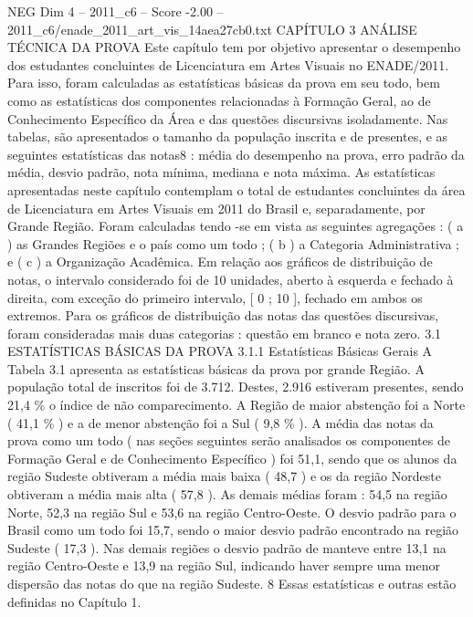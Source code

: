 \begin{textsample}{NEG Dim 4 – 2011\_c6 – Score -2.00 – 2011\_c6/enade\_2011\_art\_vis\_14aea27cb0.txt}  \label{ex:f4_neg_056}
CAPÍTULO 3 ANÁLISE TÉCNICA DA PROVA Este capítulo tem por objetivo apresentar o desempenho dos estudantes concluintes de Licenciatura em Artes Visuais no ENADE/2011.
Para isso, foram calculadas as estatísticas básicas da prova em seu todo, bem como as estatísticas dos componentes relacionadas à Formação Geral, ao de Conhecimento Específico da Área e das questões discursivas isoladamente.
Nas tabelas, são apresentados o tamanho da população inscrita e de presentes, e as seguintes estatísticas das notas8 : média do desempenho na prova, erro padrão da média, desvio padrão, nota mínima, mediana e nota máxima.
As estatísticas apresentadas neste capítulo contemplam o total de estudantes concluintes da área de Licenciatura em Artes Visuais em 2011 do Brasil e, separadamente, por Grande Região.
Foram calculadas tendo -se em vista as seguintes agregações : ( a ) as Grandes Regiões e o país como um todo ; ( b ) a Categoria Administrativa ; e ( c ) a Organização Acadêmica.
Em relação aos gráficos de distribuição de notas, o intervalo considerado foi de 10 unidades, aberto à esquerda e fechado à direita, com exceção do primeiro intervalo, [ 0 ; 10 ], fechado em ambos os extremos.
Para os gráficos de distribuição das notas das questões discursivas, foram consideradas mais duas categorias : questão em branco e nota zero. 3.1 ESTATÍSTICAS BÁSICAS DA PROVA 3.1.1 Estatísticas Básicas Gerais A Tabela 3.1 apresenta as estatísticas básicas da prova por grande Região.
A população total de inscritos foi de 3.712.
Destes, 2.916 estiveram presentes, sendo 21,4 \% o índice de não comparecimento.
A Região de maior abstenção foi a Norte ( 41,1 \% ) e a de menor abstenção foi a Sul ( 9,8 \% ).
A média das notas da prova como um todo ( nas seções seguintes serão analisados os componentes de Formação Geral e de Conhecimento Específico ) foi 51,1, sendo que os alunos da região Sudeste obtiveram a média mais baixa ( 48,7 ) e os da região Nordeste obtiveram a média mais alta ( 57,8 ).
As demais médias foram : 54,5 na região Norte, 52,3 na região Sul e 53,6 na região Centro-Oeste.
O desvio padrão para o Brasil como um todo foi 15,7, sendo o maior desvio padrão encontrado na região Sudeste ( 17,3 ).
Nas demais regiões o desvio padrão de manteve entre 13,1 na região Centro-Oeste e 13,9 na região Sul, indicando haver sempre uma menor dispersão das notas do que na região Sudeste. 8 Essas estatísticas e outras estão definidas no Capítulo 1.

\end{textsample}

